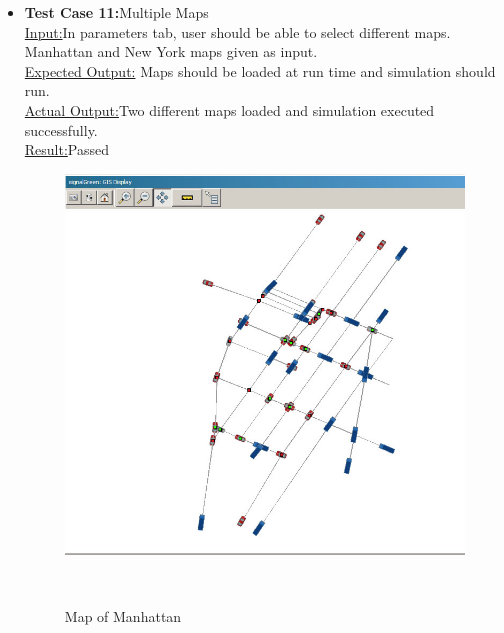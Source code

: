 \documentclass[11pt]{article}
\begin{document}
\begin{enumerate}
\begin{itemize}
\begin{itemize}
		
		\item \textbf{Test Case 11:}Multiple Maps\hfill \\
		\underline{Input:}In parameters tab, user should be able to select different maps. Manhattan and New York maps given as input.  \hfill \\
		\underline{Expected Output:} Maps should be loaded at run time and simulation should run.\hfill \\
		\underline{Actual Output:}Two different maps loaded and simulation executed successfully.\hfill \\
		\underline{Result:}Passed
		\begin{figure}[h]
		\begin{center}
		\includegraphics[scale=0.3]{manhattan_section}
		\caption{Map of Manhattan}\hfill \\
		\end{center}
		\end{figure}\hfill \\
		
		
	\end{itemize}


\end{itemize}
\end{enumerate}
\end{document}
